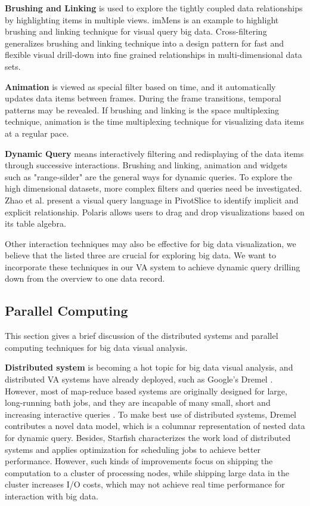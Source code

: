 \documentclass[journal]{vgtc}                %
\begin{document}
{\textbf{Brushing and Linking} is used to explore the tightly coupled data relationships by highlighting items in multiple views. imMens \cite{2013-immens} is an example to highlight brushing and linking technique for visual query big data. Cross-filtering \cite{weaver2010cross} generalizes brushing and linking technique into a design pattern for fast and flexible visual drill-down into fine grained relationships in multi-dimensional data sets. 


\textbf{Animation} is viewed as special filter based on time, and it automatically updates data items between frames. During the frame transitions, temporal patterns may be revealed. If brushing and linking  is the space multiplexing technique, animation is the time multiplexing technique for visualizing data items at a regular pace.

\textbf{Dynamic Query} means interactively filtering and redisplaying of the data items through successive interactions. Brushing and linking, animation and widgets such as "range-silder" are the general ways for dynamic queries. To explore the high dimensional datasets, more complex filters and queries need be investigated. Zhao et al. \cite{zhao2013interactive} present a visual query language in PivotSlice to identify implicit and explicit relationship. Polaris \cite{stolte2002polaris} allows users to drag and drop visualizations based on its table algebra.

Other interaction techniques may also be effective for big data visualization, we believe that the listed three are crucial for exploring big data. We want to incorporate these techniques in our VA system to achieve dynamic query drilling down from the overview to one data record. 
 

\subsection{Parallel Computing}
This section gives a brief discussion of the distributed systems and parallel computing techniques for big data visual analysis.

\textbf{Distributed system} is becoming a hot topic for big data visual analysis, and distributed VA systems have already deployed, such as Google's Dremel \cite{melnik2010dremel}. However, most of map-reduce based systems are originally designed for large, long-running bath jobs, and they are incapable of many small, short and increasing interactive queries \cite{Chen:2012}. To make best use of distributed systems, Dremel \cite{melnik2010dremel} contributes a novel data model, which is a columnar representation of nested data for dynamic query. Besides, Starfish \cite{herodotou} characterizes the work load of distributed systems and applies optimization for scheduling jobs to achieve better performance. However, such kinds of improvements focus on shipping the computation to a cluster of processing nodes, while shipping large data in the cluster increases I/O costs, which may not achieve real time performance for interaction with big data. 

}
\end{document}

